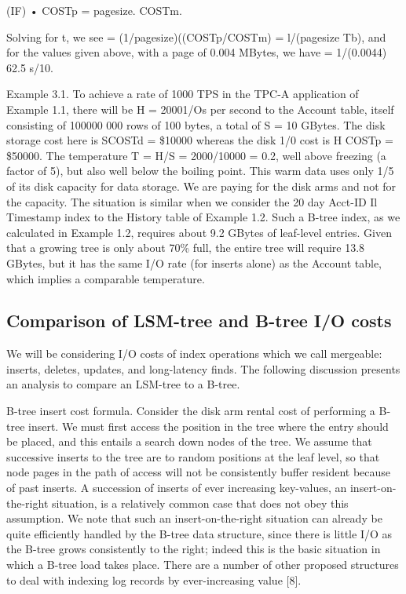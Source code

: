 \documentclass[a4paper,12pt,notitlepage,twoside,openright]{article}
\begin{document}
(IF) • COSTp = pagesize. COSTm.

Solving for t, we see = (1/pagesize)((COSTp/COSTm) = l/(pagesize Tb),
and for the values given above, with a page of 0.004 MBytes, we have =
1/(0.0044) 62.5 s/10.

Example 3.1. To achieve a rate of 1000 TPS in the TPC-A application of
Example 1.1, there will be H = 20001/Os per second to the Account table,
itself consisting of 100000 000 rows of 100 bytes, a total of S = 10
GBytes. The disk storage cost here is SCOSTd = \$10000 whereas the disk
1/0 cost is H COSTp = \$50000. The temperature T = H/S = 2000/10000 =
0.2, well above freezing (a factor of 5), but also well below the
boiling point. This warm data uses only 1/5 of its disk capacity for
data storage. We are paying for the disk arms and not for the capacity.
The situation is similar when we consider the 20 day Acct-ID Il
Timestamp index to the History table of Example 1.2. Such a B-tree
index, as we calculated in Example 1.2, requires about 9.2 GBytes of
leaf-level entries. Given that a growing tree is only about 70\% full,
the entire tree will require 13.8 GBytes, but it has the same I/O rate
(for inserts alone) as the Account table, which implies a comparable
temperature.


\hypertarget{comparison-of-lsm-tree-and-b-tree-io-costs}{%
\subsection{Comparison of LSM-tree and B-tree I/O
costs}\label{comparison-of-lsm-tree-and-b-tree-io-costs}}


We will be considering I/O costs of index operations which we call
mergeable: inserts, deletes, updates, and long-latency finds. The
following discussion presents an analysis to compare an LSM-tree to a
B-tree.

B-tree insert cost formula. Consider the disk arm rental cost of
performing a B-tree insert. We must first access the position in the
tree where the entry should be placed, and this entails a search down
nodes of the tree. We assume that successive inserts to the tree are to
random positions at the leaf level, so that node pages in the path of
access will not be consistently buffer resident because of past inserts.
A succession of inserts of ever increasing key-values, an
insert-on-the-right situation, is a relatively common case that does not
obey this assumption. We note that such an insert-on-the-right situation
can already be quite efficiently handled by the B-tree data structure,
since there is little I/O as the B-tree grows consistently to the right;
indeed this is the basic situation in which a B-tree load takes place.
There are a number of other proposed structures to deal with indexing
log records by ever-increasing value {[}8{]}.
\end{document}
